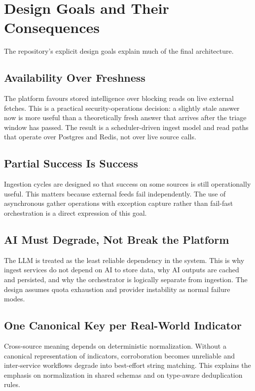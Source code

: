 \section{Design Goals and Their Consequences}
The repository's explicit design goals explain much of the final architecture.

\subsection{Availability Over Freshness}
The platform favours stored intelligence over blocking reads on live external fetches. This is a practical security-operations decision: a slightly stale answer now is more useful than a theoretically fresh answer that arrives after the triage window has passed. The result is a scheduler-driven ingest model and read paths that operate over Postgres and Redis, not over live source calls.

\subsection{Partial Success Is Success}
Ingestion cycles are designed so that success on some sources is still operationally useful. This matters because external feeds fail independently. The use of asynchronous gather operations with exception capture rather than fail-fast orchestration is a direct expression of this goal.

\subsection{AI Must Degrade, Not Break the Platform}
The LLM is treated as the least reliable dependency in the system. This is why ingest services do not depend on AI to store data, why AI outputs are cached and persisted, and why the orchestrator is logically separate from ingestion. The design assumes quota exhaustion and provider instability as normal failure modes.

\subsection{One Canonical Key per Real-World Indicator}
Cross-source meaning depends on deterministic normalization. Without a canonical representation of indicators, corroboration becomes unreliable and inter-service workflows degrade into best-effort string matching. This explains the emphasis on normalization in shared schemas and on type-aware deduplication rules.

